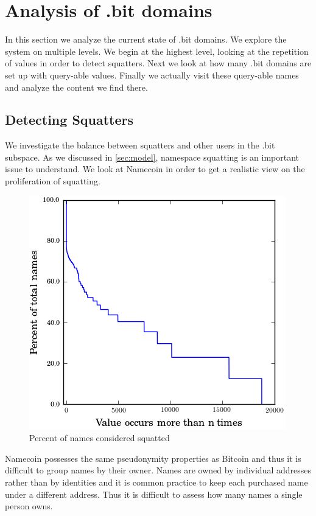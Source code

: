 \section{Analysis of .bit domains}

In this section we analyze the current state of .bit domains. We explore the system on multiple levels. We begin at the highest level, looking at the repetition of values in order to detect squatters. Next we look at how many .bit domains are set up with query-able values. Finally we actually visit these query-able names and analyze the content we find there.

\subsection{Detecting Squatters}

We investigate the balance between squatters and other users in the .bit subspace. As we discussed in \ref{sec:model}, namespace squatting is an important issue to understand. We look at Namecoin in order to get a realistic view on the proliferation of squatting.

\begin{figure}
  \centering
  \includegraphics[width=0.9\columnwidth]{figures/squatters}
  \caption{Percent of names considered squatted}
  \label{fig:percentSquatter}
\end{figure}

Namecoin possesses the same pseudonymity properties as Bitcoin and thus it is difficult to group names by their owner. Names are owned by individual addresses rather than by identities and it is common practice to keep each purchased name under a different address. Thus it is difficult to assess how many names a single person owns. 

